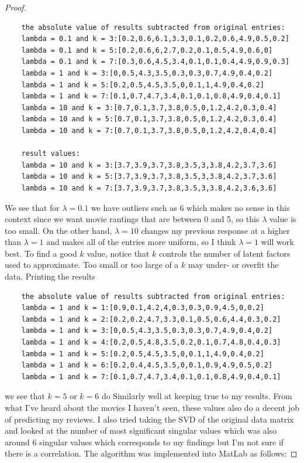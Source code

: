 \documentclass[12pt]{report}
\begin{document}
\begin{problem}
\begin{proof}
\begin{verbatim}
    the absolute value of results subtracted from original entries:
    lambda = 0.1 and k = 3:[0.2,0.6,6.1,3.3,0.1,0.2,0.6,4.9,0.5,0.2]
    lambda = 0.1 and k = 5:[0.2,0.6,6,2.7,0.2,0.1,0.5,4.9,0.6,0]
    lambda = 0.1 and k = 7:[0.3,0.6,4.5,3.4,0.1,0.1,0.4,4.9,0.9,0.3]
    lambda = 1 and k = 3:[0,0.5,4.3,3.5,0.3,0.3,0.7,4.9,0.4,0.2]
    lambda = 1 and k = 5:[0.2,0.5,4.5,3.5,0,0.1,1,4.9,0.4,0.2]
    lambda = 1 and k = 7:[0.1,0.7,4.7,3.4,0.1,0.1,0.8,4.9,0.4,0.1]
    lambda = 10 and k = 3:[0.7,0.1,3.7,3.8,0.5,0,1.2,4.2,0.3,0.4]
    lambda = 10 and k = 5:[0.7,0.1,3.7,3.8,0.5,0,1.2,4.2,0.3,0.4]
    lambda = 10 and k = 7:[0.7,0.1,3.7,3.8,0.5,0,1.2,4.2,0.4,0.4]

    result values:
    lambda = 10 and k = 3:[3.7,3.9,3.7,3.8,3.5,3,3.8,4.2,3.7,3.6]
    lambda = 10 and k = 5:[3.7,3.9,3.7,3.8,3.5,3,3.8,4.2,3.7,3.6]
    lambda = 10 and k = 7:[3.7,3.9,3.7,3.8,3.5,3,3.8,4.2,3.6,3.6] 
\end{verbatim}
We see that for $\lambda = 0.1$ we have outliers such as $6$ which makes no sense in this context since we want movie rantings that are between 0 and 5, so this $\lambda$ value is too small. On the other hand, $\lambda = 10$ changes my previous response at a higher than $\lambda = 1$ and makes all of the entries more uniform, so I think $\lambda = 1$ will work best. To find a good $k$ value, notice that $k$ controls the number of latent factors used to approximate. Too small or too large of a $k$ may under- or overfit the data. Printing the results
\begin{verbatim}
    the absolute value of results subtracted from original entries:
    lambda = 1 and k = 1:[0.9,0.1,4.2,4,0.3,0.3,0.9,4.5,0,0.2]
    lambda = 1 and k = 2:[0.2,0.2,4.7,3.3,0.1,0.5,0.6,4.4,0.3,0.2]
    lambda = 1 and k = 3:[0,0.5,4.3,3.5,0.3,0.3,0.7,4.9,0.4,0.2]
    lambda = 1 and k = 4:[0.2,0.5,4.8,3.5,0.2,0.1,0.7,4.8,0.4,0.3]
    lambda = 1 and k = 5:[0.2,0.5,4.5,3.5,0,0.1,1,4.9,0.4,0.2]
    lambda = 1 and k = 6:[0.2,0.4,4.5,3.5,0,0.1,0.9,4.9,0.5,0.2]
    lambda = 1 and k = 7:[0.1,0.7,4.7,3.4,0.1,0.1,0.8,4.9,0.4,0.1]
\end{verbatim}
we see that $k = 5$ or $k = 6$ do Similarly well at keeping true to my results. From what I've heard about the movies I haven't seen, these values also do a decent job of predicting my reviews. I also tried taking the SVD of the original data matrix and looked at the number of most significant singular values which was also around $6$ singular values which corresponds to my findings but I'm not sure if there is a correlation. The algorithm was implemented into MatLab as follows:

\end{proof}
\end{problem}
\end{document}

